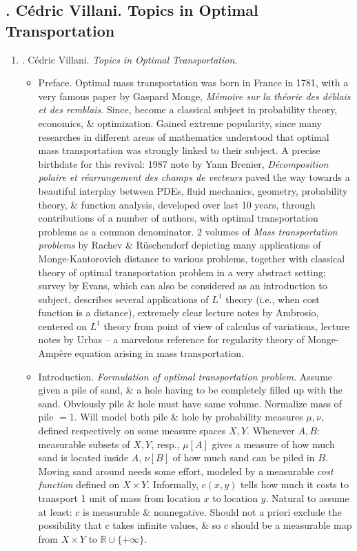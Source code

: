 \documentclass{article}
\begin{document}

\subsection{\cite{Villani2003}. {\sc C\'{e}dric Villani}. Topics in Optimal Transportation}

\begin{enumerate}
	\item \cite{Villani2003}. {\sc C\'{e}dric Villani}. {\it Topics in Optimal Transportation}.

	\begin{itemize}
		\item {\sf Preface.} Optimal mass transportation was born in France in 1781, with a very famous paper by {\sc Gaspard Monge}, {\it M\'emoire sur la th\'eorie des d\'eblais et des remblais}. Since, become a classical subject in probability theory, economics, \& optimization. Gained extreme popularity, since many researches in different areas of mathematics understood that optimal mass transportation was strongly linked to their subject. A precise birthdate for this revival: 1987 note by {\sc Yann Brenier}, {\it D\'ecomposition polaire et r\'earrangement des champs de vecteurs} paved the way towards a beautiful interplay between PDEs, fluid mechanics, geometry, probability theory, \& function analysis, developed over last 10 years, through contributions of a number of authors, with optimal transportation problems as a common denominator. 2 volumes of {\it Mass transportation problems} by {\sc Rachev \& R\"uschendorf} depicting many applications of Monge-Kantorovich distance to various problems, together with classical theory of optimal transportation problem in a very abstract setting; survey by {\sc Evans}, which can also be considered as an introduction to subject, describes several applications of $L^1$ theory (i.e., when cost function is a distance), extremely clear lecture notes by {\sc Ambrosio}, centered on $L^1$ theory from point of view of calculus of variations, lecture notes by {\sc Urbas} -- a marvelous reference for regularity theory of Monge-Amp\`ere equation arising in mass transportation.

		\item {\sf Introduction.} {\it Formulation of optimal transportation problem.} Assume given a pile of sand, \& a hole having to be completely filled up with the sand. Obviously pile \& hole must have same volume. Normalize mass of pile $= 1$. Will model both pile \& hole by probability measures $\mu,\nu$, defined respectively on some measure spaces $X,Y$. Whenever $A,B$: measurable subsets of $X,Y$, resp., $\mu[A]$ gives a measure of how much sand is located inside $A$, $\nu[B]$ of how much sand can be piled in $B$. Moving sand around needs some effort, modeled by a measurable {\it cost function} defined on $X\times Y$. Informally, $c(x,y)$ tells how much it costs to transport 1 unit of mass from location $x$ to location $y$. Natural to assume at least: $c$ is measurable \& nonnegative. Should not a priori exclude the possibility that $c$ takes infinite values, \& so $c$ should be a measurable map from $X\times Y$ to $\mathbb{R}\cup\{+\infty\}$.


\end{itemize}
\end{enumerate}
\end{document}
